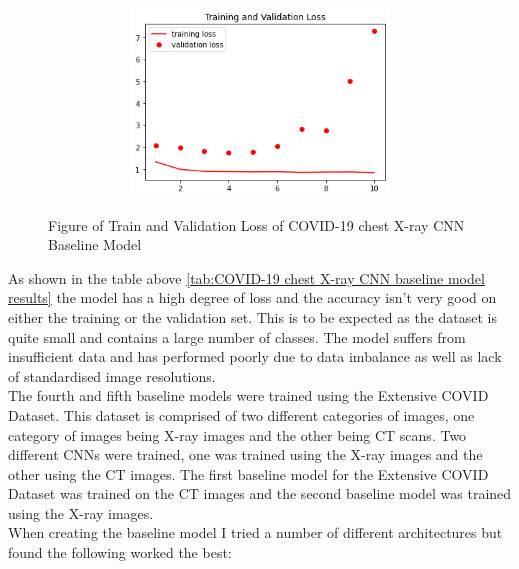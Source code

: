  \begin{figure}[H]
    \centering
\includegraphics[width=1\textwidth,height=5cm,keepaspectratio]{Images/ChestXrayCNNBaselineTrainAndValLoss.png}\\
    \caption{Figure of Train and Validation Loss of COVID-19 chest X-ray CNN Baseline Model}
    \label{fig:COVID-19 chest X-ray CNN Baseline Train and Validation Loss}
\end{figure}
As shown in the table above \ref{tab:COVID-19 chest X-ray CNN baseline model results} the model has a high degree of loss and the accuracy isn't very good on either the training or the validation set.  This is to be expected as the dataset is quite small and contains a large number of classes.  The model suffers from insufficient data and has performed poorly due to data imbalance as well as lack of standardised image resolutions.
\\
The fourth and fifth baseline models were trained using the Extensive COVID Dataset.  This dataset is comprised of two different categories of images, one category of images being X-ray images and the other being CT scans.  Two different CNNs were trained, one was trained using the X-ray images and the other using the CT images.  The first baseline model for the Extensive COVID Dataset was trained on the CT images and the second baseline model was trained using the X-ray images.
\\
When creating the baseline model I tried a number of different architectures but found the following worked the best:
